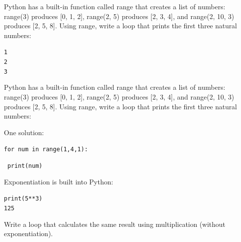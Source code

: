 \documentclass{beamer}
\begin{document}
\begin{frame}{ }

Python has a built-in function called range that creates a list of numbers: range(3) produces [0, 1, 2], range(2, 5) produces [2, 3, 4], and range(2, 10, 3) produces [2, 5, 8]. Using range, write a loop that prints the first three natural numbers:

\vspace{0.5cm}

\begin{beamerboxesrounded}[upper=uppercolgreen,lower=lowercolgreen,shadow=false]{}
\texttt{1\\
2\\
3}
\end{beamerboxesrounded}

\end{frame}


\begin{frame}{ }

Python has a built-in function called range that creates a list of numbers: range(3) produces [0, 1, 2], range(2, 5) produces [2, 3, 4], and range(2, 10, 3) produces [2, 5, 8]. Using range, write a loop that prints the first three natural numbers:

\vspace{0.5cm}

\alert{One solution:}

\texttt{for num in range(1,4,1):}

\texttt{      print(num)}
    

\end{frame}



\begin{frame}{ }

Exponentiation is built into Python:

\vspace{0.5cm}

\begin{beamerboxesrounded}[upper=uppercolgreen,lower=lowercolgreen,shadow=false]{}

\texttt{print(5**3)\\
125}
\end{beamerboxesrounded}

\vspace{0.5cm}

Write a loop that calculates the same result using multiplication (without exponentiation).
\end{frame}
\end{document}
